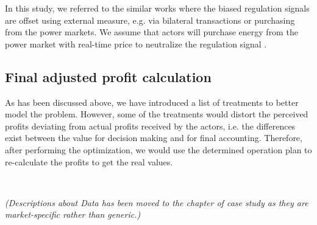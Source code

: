 In this study, we referred to the similar works \cite{Megel2017}\cite{Oudalov2007}\cite{Borsche2013}\cite{Jin2014} where the biased regulation signals are offset using external measure, e.g. via bilateral transactions or purchasing from the power markets. We assume that actors will purchase energy from the power market with real-time price to neutralize the regulation signal . 

\subsection{Final adjusted profit calculation}
As has been discussed above, we have introduced a list of treatments to better model the problem. However, some of the treatments would distort the perceived profits deviating from actual profits received by the actors, i.e. the differences exist between the value for decision making and for final accounting. Therefore, after performing the optimization, we would use the determined operation plan to re-calculate the profits to get the real values. 

~\newline

\textit{(Descriptions about Data has been moved to the chapter of case study as they are market-specific rather than generic.)}
